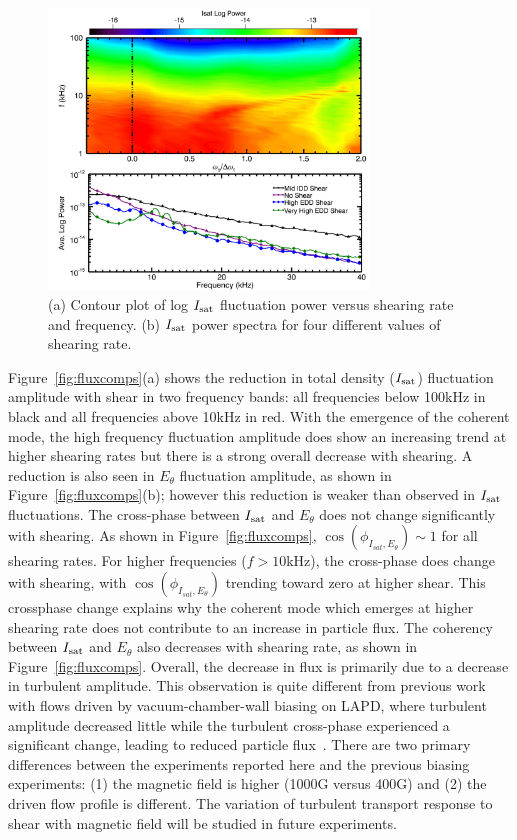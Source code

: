 \documentclass[aps,prl,amsmath,amssymb,preprint,superscriptaddress]{revtex4}
\begin{document}
\begin{figure}[!htbp]
\centerline{
\includegraphics[width=8.5cm]{powercontour.pdf}}
\caption{\label{fig:powercontour} (a) Contour plot of log $I_{\rm sat}$ fluctuation power versus shearing rate and frequency. (b) $I_{\rm sat}$ power spectra for four different values of shearing rate.}
\end{figure}

Figure~\ref{fig:fluxcomps}(a) shows the reduction in total density ($I_{\rm sat}$) fluctuation amplitude with shear in two frequency bands: all frequencies below 100kHz in black and all frequencies above 10kHz in red. With the emergence of the coherent mode, the
high frequency fluctuation amplitude does show an increasing trend at higher shearing
rates but there is a strong overall decrease with shearing.
A reduction is also seen in $E_\theta$ fluctuation amplitude, as shown in
Figure~\ref{fig:fluxcomps}(b); however this reduction is weaker than
observed in $I_{\rm sat}$ fluctuations.  The cross-phase between
$I_{\rm sat}$ and $E_\theta$ does not change significantly with
shearing. As shown in Figure~\ref{fig:fluxcomps},
$\cos(\phi_{I_{sat},E_\theta}) \sim 1$ for all shearing rates.  For
higher frequencies ($f > 10$kHz), the cross-phase does change with
shearing, with $\cos(\phi_{I_{sat},E_\theta})$ trending toward zero at
higher shear.  This crossphase change explains why the coherent mode
which emerges at higher shearing rate does not contribute to an
increase in particle flux.  The coherency between $I_{\rm sat}$ and
$E_\theta$ also decreases with shearing rate, as shown in 
Figure~\ref{fig:fluxcomps}.  Overall, the decrease in flux is primarily
due to a decrease in turbulent amplitude.  This observation is quite
different from previous work with flows driven by vacuum-chamber-wall
biasing on LAPD, where turbulent amplitude decreased little while the
turbulent cross-phase experienced a significant change, leading to
reduced particle flux~\cite{carter09}.  There are two primary
differences between the experiments reported here and the previous
biasing experiments:  (1) the magnetic field is higher (1000G versus 400G) and
(2) the driven flow profile is different.  The variation of turbulent
transport response to shear with magnetic field will be studied in
future experiments.
\end{document}
